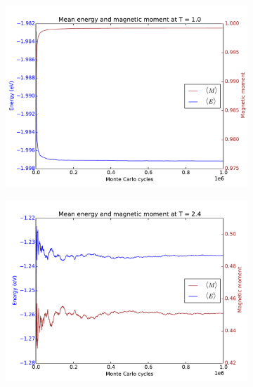 	\begin{figure}[H]
	\begin{subfigure}[b]{0.49\textwidth}
		\includegraphics[width=1\linewidth]{../results/4c/En_mag_T1_0}
		\caption{}
		\label{fig:L20_mag_T_1}
	\end{subfigure}
	\hfill
	\begin{subfigure}[b]{0.49\textwidth}
		\includegraphics[width=1\linewidth]{../results/4c/En_mag_T2_4}
		\caption{}
		\label{fig:L20_mag_T_2-4}
	\end{subfigure}
	\caption{}
\end{figure}




